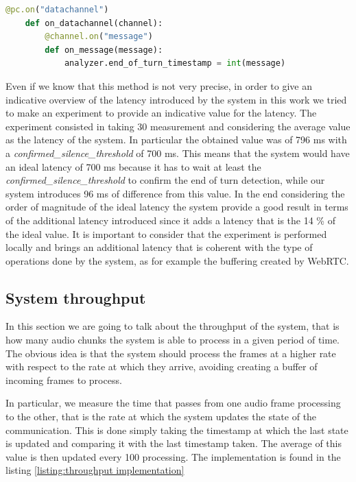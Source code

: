 \documentclass[../main.tex]{subfiles}
\begin{document}
\begin{lstlisting}[language=Python, caption={Server handling of the client timestamp}]
@pc.on("datachannel")
    def on_datachannel(channel):
        @channel.on("message")
        def on_message(message):
            analyzer.end_of_turn_timestamp = int(message)
\end{lstlisting}
\label{listing:server latency}

Even if we know that this method is not very precise, in order to give an indicative overview of the latency introduced by the system in this work we tried to make an experiment to provide an indicative value for the latency. The experiment consisted in taking 30 measurement and considering the average value as the latency of the system. In particular the obtained value was of 796 ms with a \textit{confirmed\_silence\_threshold} of 700 ms. This means that the system would have an ideal latency of 700 ms because it has to wait at least the \textit{confirmed\_silence\_threshold} to confirm the end of turn detection, while our system introduces 96 ms of difference from this value. In the end considering the order of magnitude of the ideal latency the system provide a good result in terms of the additional latency introduced since it adds a latency that is the 14 \% of the ideal value. It is important to consider that the experiment is performed locally and brings an additional latency that is coherent with the type of operations done by the system, as for example the buffering created by WebRTC. 

\subsection{System throughput}

In this section we are going to talk about the throughput of the system, that is how many audio chunks the system is able to process in a given period of time. The obvious idea is that the system should process the frames at a higher rate with respect to the rate at which they arrive, avoiding creating a buffer of incoming frames to process. 

In particular, we measure the time that passes from one audio frame processing to the other, that is the rate at which the system updates the state of the communication. This is done simply taking the timestamp at which the last state is updated and comparing it with the last timestamp taken. The average of this value is then updated every 100 processing. The implementation is found in the listing \ref{listing:throughput implementation}
\end{document}

